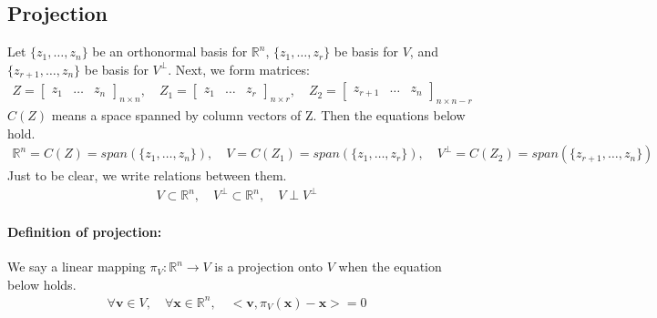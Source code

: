 \documentclass{article}
\begin{document}
\subsection{Projection}
Let \(\{z_1, \dots, z_n \}\) be an orthonormal basis for \(\mathbb{R}^n\), \(\{z_1, \dots, z_r \}\) be basis for \(V\), and \(\{z_{r+1}, \dots, z_n \}\) be basis for \(V^\perp\). Next, we form matrices:
\begin{align*}
Z= \left[ \begin{matrix}z_1 & \dots & z_n\end{matrix} \right]_{n\times n} ,
\quad Z_1 = \left[ \begin{matrix}z_1 & \dots & z_r\end{matrix} \right]_{n\times r},
\quad Z_2 = \left[ \begin{matrix}z_{r+1} & \dots & z_n\end{matrix} \right]_{n\times n-r}
\end{align*}
\(C(Z)\) means a space spanned by column vectors of Z. Then the equations below hold.
\begin{align*}
\mathbb{R}^n=C(Z)=span(\{z_1,\dots,z_n\}), \quad
V = C(Z_1)=span(\{z_1,\dots,z_r\}), \quad
V^\perp = C(Z_2)=span(\{z_{r+1}, \dots, z_n\})
\end{align*}
Just to be clear, we write relations between them.
\begin{align*}
V \subset \mathbb{R}^n, \quad V^\perp \subset \mathbb{R}^n, \quad V \perp V^\perp
\end{align*}
\paragraph{Definition of projection:} We say a linear mapping \(\pi_V: \mathbb{R}^n \rightarrow V\) is a projection onto \(V\) when the equation below holds.
\begin{align*}
\forall \mathbf{v}\in V, \quad \forall \mathbf{x}\in \mathbb{R}^n, \quad <\mathbf{v}, \pi_V(\mathbf{x})-\mathbf{x}>=0
\end{align*}
\end{document}
